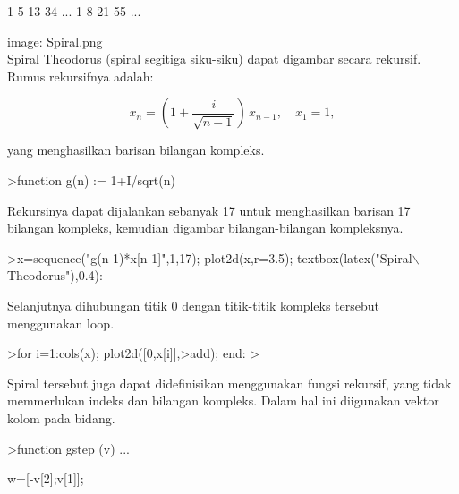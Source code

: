 \documentclass[a4paper,10pt]{article}
\begin{document}
\begin{eulernotebook}
\begin{eulercomment}
\begin{eulercomment}
\begin{eulercomment}
\begin{eulercomment}
\begin{eulercomment}
\begin{eulercomment}
\begin{eulercomment}
\begin{eulercomment}
\begin{eulercomment}
\begin{eulercomment}
\begin{eulercomment}
\begin{eulercomment}
\begin{eulercomment}
\begin{eulercomment}
\begin{eulercomment}
\begin{eulercomment}
\begin{eulercomment}
\begin{eulercomment}
\begin{eulercomment}
\begin{eulercomment}
\begin{eulercomment}
\begin{eulercomment}
\begin{euleroutput}
              1             5            13            34     ...
              1             8            21            55     ...
\end{euleroutput}
\begin{eulercomment}
image: Spiral.png\\
Spiral Theodorus (spiral segitiga siku-siku) dapat digambar secara
rekursif. Rumus rekursifnya adalah:

\end{eulercomment}
\begin{eulerformula}
\[
x_n = \left( 1 + \frac{i}{\sqrt{n-1}} \right) \, x_{n-1}, \quad x_1=1,
\]
\end{eulerformula}
\begin{eulercomment}
yang menghasilkan barisan bilangan kompleks.
\end{eulercomment}
\begin{eulerprompt}
>function g(n) := 1+I/sqrt(n)
\end{eulerprompt}
\begin{eulercomment}
Rekursinya dapat dijalankan sebanyak 17 untuk menghasilkan barisan 17 bilangan kompleks,
kemudian digambar bilangan-bilangan kompleksnya.
\end{eulercomment}
\begin{eulerprompt}
>x=sequence("g(n-1)*x[n-1]",1,17); plot2d(x,r=3.5); textbox(latex("Spiral\(\backslash\) Theodorus"),0.4):
\end{eulerprompt}
\begin{eulercomment}
Selanjutnya dihubungan titik 0 dengan titik-titik kompleks tersebut menggunakan loop.
\end{eulercomment}
\begin{eulerprompt}
>for i=1:cols(x); plot2d([0,x[i]],>add); end:
> 
\end{eulerprompt}
\begin{eulercomment}
Spiral tersebut juga dapat didefinisikan menggunakan fungsi rekursif, yang tidak memmerlukan
indeks dan bilangan kompleks. Dalam hal ini diigunakan vektor kolom pada bidang.
\end{eulercomment}
\begin{eulerprompt}
>function gstep (v) ...
\end{eulerprompt}
\begin{eulerudf}
  w=[-v[2];v[1]];

\end{eulerudf}
\end{eulercomment}
\end{eulercomment}
\end{eulercomment}
\end{eulercomment}
\end{eulercomment}
\end{eulercomment}
\end{eulercomment}
\end{eulercomment}
\end{eulercomment}
\end{eulercomment}
\end{eulercomment}
\end{eulercomment}
\end{eulercomment}
\end{eulercomment}
\end{eulercomment}
\end{eulercomment}
\end{eulercomment}
\end{eulercomment}
\end{eulercomment}
\end{eulercomment}
\end{eulercomment}
\end{eulercomment}
\end{eulernotebook}
\end{document}
